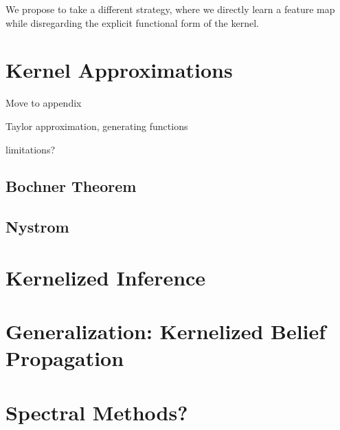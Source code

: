 \documentclass{article}
\begin{document}
We propose to take a different strategy, where we directly learn a feature map
while disregarding the explicit functional form of the kernel.

\section{Kernel Approximations}
Move to appendix

Taylor approximation, generating functions

limitations?
\subsection{Bochner Theorem}
\subsection{Nystrom}

\section{Kernelized Inference}

\section{Generalization: Kernelized Belief Propagation}

\section{Spectral Methods?}



\end{document}
